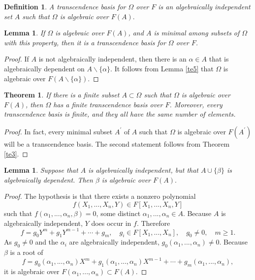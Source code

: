 \documentclass[a4paper,11pt,final,openany]{memoir}
\newtheorem{lemma}[X]{Lemma}
\newtheorem{theorem}[X]{Theorem}
\newtheorem{definition}[X]{Definition}
\theoremstyle{nonumberplain}
\newtheorem{proof}{Proof.}
\begin{document}
\begin{definition}
\label{te6}A \emph{transcendence basis}%
%
\emph{\/} for $\Omega$ over $F$ is an algebraically independent set $A$ such
that $\Omega$ is algebraic over $F(A).$
\end{definition}

\begin{lemma}
\label{te7}If $\Omega$ is algebraic over $F(A)$, and $A$ is minimal among
subsets of $\Omega$ with this property, then it is a transcendence basis for
$\Omega$ over $F$.
\end{lemma}

\begin{proof}
If $A$ is not algebraically independent, then there is an $\alpha\in A$ that
is algebraically dependent on $A\smallsetminus\{\alpha\}$. It follows from
Lemma \ref{te5} that $\Omega$ is algebraic over $F(A\smallsetminus
\{\alpha\}).$
\end{proof}

\begin{theorem}
\label{te8}If there is a finite subset $A\subset\Omega$ such that $\Omega$ is
algebraic over $F(A)$, then $\Omega$ has a finite transcendence basis over
$F$. Moreover, every transcendence basis is finite, and they all have the same
number of elements.
\end{theorem}

\begin{proof}
In fact, every minimal subset $A^{\prime}$ of $A$ such that $\Omega$ is
algebraic over $F(A^{\prime})$ will be a transcendence basis. The second
statement follows from Theorem \ref{te3}.
\end{proof}

\begin{lemma}
\label{te11}Suppose that $A$ is algebraically independent, but that
$A\cup\{\beta\}$ is algebraically dependent. Then $\beta$ is algebraic over
$F(A).$
\end{lemma}

\begin{proof}
The hypothesis is that there exists a nonzero polynomial
\[
f(X_{1},...,X_{n},Y)\in F[X_{1},...,X_{n},Y]
\]
such that $f(\alpha_{1},...,\alpha_{n},\beta)=0$, some distinct $\alpha
_{1},...,\alpha_{n}\in A$. Because $A$ is algebraically independent, $Y$ does
occur in $f$. Therefore
\[
f=g_{0}Y^{m}+g_{1}Y^{m-1}+\cdots+g_{m},\quad g_{i}\in F[X_{1},...,X_{n}],\quad
g_{0}\neq0,\quad m\geq1.
\]
As $g_{0}\neq0$ and the $\alpha_{i}$ are algebraically independent,
$g_{0}(\alpha_{1},...,\alpha_{n})\neq0$. Because $\beta$ is a root of
\[
f=g_{0}(\alpha_{1},...,\alpha_{n})X^{m}+g_{1}(\alpha_{1},...,\alpha
_{n})X^{m-1}+\cdots+g_{m}(\alpha_{1},...,\alpha_{n}),
\]
it is algebraic over $F(\alpha_{1},...,\alpha_{n})\subset F(A).$
\end{proof}
\end{document}
